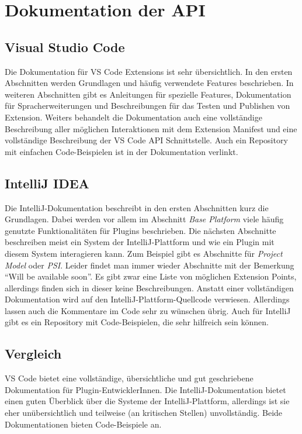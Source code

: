 \section{Dokumentation der API}
\label{sec:Vergleich_Dokumentation}

\subsection{Visual Studio Code}

Die Dokumentation für VS Code Extensions ist sehr übersichtlich.
In den ersten Abschnitten werden Grundlagen und häufig 
verwendete Features beschrieben.
In weiteren Abschnitten gibt es Anleitungen für spezielle Features,
Dokumentation für Spracherweiterungen und Beschreibungen
für das Testen und Publishen von Extension.
Weiters behandelt die Dokumentation auch eine vollständige Beschreibung
aller möglichen Interaktionen mit dem Extension Manifest
und eine vollständige Beschreibung der VS Code API Schnittstelle.
Auch ein Repository mit einfachen Code-Beispielen ist in der Dokumentation verlinkt.

\subsection{IntelliJ IDEA}

Die IntelliJ-Dokumentation beschreibt in den ersten Abschnitten kurz
die Grundlagen. Dabei werden vor allem im
Abschnitt \emph{Base Platform} viele häufig genutzte Funktionalitäten
für Plugins beschrieben. Die nächsten Abschnitte beschreiben
meist ein System der IntelliJ-Plattform und wie ein Plugin mit diesem
System interagieren kann. Zum Beispiel gibt es Abschnitte für \emph{Project Model}
oder \emph{PSI}. Leider findet man immer wieder Abschnitte mit der 
Bemerkung \enquote{Will be available soon}.
Es gibt zwar eine Liste von möglichen Extension Points, allerdings
finden sich in dieser keine Beschreibungen. Anstatt einer vollständigen
Dokumentation wird auf den IntelliJ-Plattform-Quellcode verwiesen.
Allerdings lassen auch die Kommentare im Code sehr zu wünschen übrig.
Auch für IntelliJ gibt es ein Repository mit Code-Beispielen, die sehr
hilfreich sein können.

\subsection{Vergleich}

VS Code bietet eine vollständige, übersichtliche und gut geschriebene 
Dokumentation für Plugin-EntwicklerInnen. Die IntelliJ-Dokumentation
bietet einen guten Überblick über die Systeme der IntelliJ-Plattform,
allerdings ist sie eher unübersichtlich und teilweise 
(an kritischen Stellen) unvollständig.
Beide Dokumentationen bieten Code-Beispiele an.

